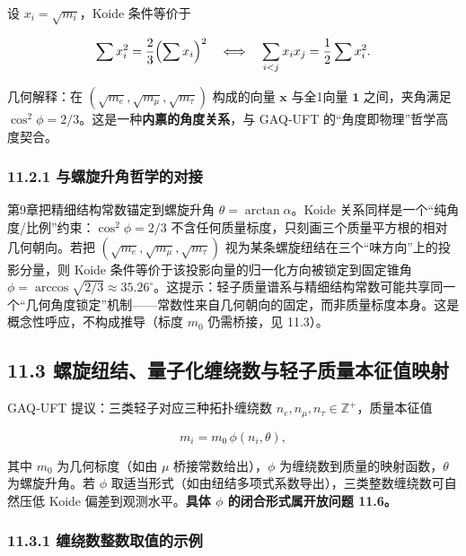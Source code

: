 设 \(x_i=\sqrt{m_i}\)，Koide 条件等价于

\[
\sum x_i^2 = \frac{2}{3}\Bigl(\sum x_i\Bigr)^2
\quad\Longleftrightarrow\quad
\sum_{i<j}x_ix_j=\frac{1}{2}\sum x_i^2.
\]

几何解释：在 \((\sqrt{m_e},\sqrt{m_\mu},\sqrt{m_\tau})\) 构成的向量
\(\mathbf{x}\) 与全1向量 \(\mathbf{1}\) 之间，夹角满足
\(\cos^2\phi=2/3\)。这是一种\textbf{内禀的角度关系}，与 GAQ‑UFT
的``角度即物理''哲学高度契合。

\subsubsection{11.2.1
与螺旋升角哲学的对接}\label{ux4e0eux87baux65cbux5347ux89d2ux54f2ux5b66ux7684ux5bf9ux63a5}

第9章把精细结构常数锚定到螺旋升角 \(\theta=\arctan\alpha\)。Koide
关系同样是一个``纯角度/比例''约束：\(\cos^2\phi=2/3\)
不含任何质量标度，只刻画三个质量平方根的相对几何朝向。若把
\((\sqrt{m_e},\sqrt{m_\mu},\sqrt{m_\tau})\)
视为某条螺旋纽结在三个``味方向''上的投影分量，则 Koide
条件等价于该投影向量的归一化方向被锁定到固定锥角
\(\phi=\arccos\sqrt{2/3}\approx35.26^\circ\)。这提示：轻子质量谱系与精细结构常数可能共享同一个``几何角度锁定''机制------常数性来自几何朝向的固定，而非质量标度本身。这是概念性呼应，不构成推导（标度
\(m_0\) 仍需桥接，见 11.3）。

\subsection{11.3
螺旋纽结、量子化缠绕数与轻子质量本征值映射}\label{ux87baux65cbux7ebdux7ed3ux91cfux5b50ux5316ux7f20ux7ed5ux6570ux4e0eux8f7bux5b50ux8d28ux91cfux672cux5f81ux503cux6620ux5c04}

GAQ‑UFT 提议：三类轻子对应三种拓扑缠绕数
\(n_e,n_\mu,n_\tau\in\mathbb{Z}^+\)，质量本征值

\[
m_i = m_0\,\phi(n_i,\theta),
\]

其中 \(m_0\) 为几何标度（如由 \(\mu\) 桥接常数给出），\(\phi\)
为缠绕数到质量的映射函数，\(\theta\) 为螺旋升角。若 \(\phi\)
取适当形式（如由纽结多项式系数导出），三类整数缠绕数可自然压低 Koide
偏差到观测水平。\textbf{具体 \(\phi\) 的闭合形式属开放问题 11.6。}

\subsubsection{11.3.1
缠绕数整数取值的示例}\label{ux7f20ux7ed5ux6570ux6574ux6570ux53d6ux503cux7684ux793aux4f8b}

